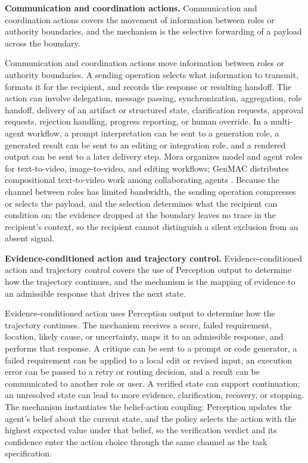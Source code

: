 \textbf{Communication and coordination actions.} Communication and coordination actions covers the movement of information between roles or authority boundaries, and the mechanism is the selective forwarding of a payload across the boundary.

Communication and coordination actions move information between roles or authority boundaries. A sending operation selects what information to transmit, formats it for the recipient, and records the response or resulting handoff. The action can involve delegation, message passing, synchronization, aggregation, role handoff, delivery of an artifact or structured state, clarification requests, approval requests, rejection handling, progress reporting, or human override. In a multi-agent workflow, a prompt interpretation can be sent to a generation role, a generated result can be sent to an editing or integration role, and a rendered output can be sent to a later delivery step. Mora organizes model and agent roles for text-to-video, image-to-video, and editing workflows; GenMAC distributes compositional text-to-video work among collaborating agents \cite{yuan2024mora,huang2024genmac}. Because the channel between roles has limited bandwidth, the sending operation compresses or selects the payload, and the selection determines what the recipient can condition on; the evidence dropped at the boundary leaves no trace in the recipient's context, so the recipient cannot distinguish a silent exclusion from an absent signal.

\textbf{Evidence-conditioned action and trajectory control.} Evidence-conditioned action and trajectory control covers the use of Perception output to determine how the trajectory continues, and the mechanism is the mapping of evidence to an admissible response that drives the next state.

Evidence-conditioned action uses Perception output to determine how the trajectory continues. The mechanism receives a score, failed requirement, location, likely cause, or uncertainty, maps it to an admissible response, and performs that response. A critique can be sent to a prompt or code generator, a failed requirement can be applied to a local edit or revised input, an execution error can be passed to a retry or routing decision, and a result can be communicated to another role or user. A verified state can support continuation; an unresolved state can lead to more evidence, clarification, recovery, or stopping. The mechanism instantiates the belief-action coupling: Perception updates the agent's belief about the current state, and the policy selects the action with the highest expected value under that belief, so the verification verdict and its confidence enter the action choice through the same channel as the task specification.

